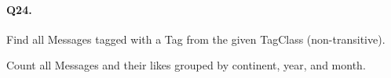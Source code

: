 \paragraph{Q24.}

Find all Messages tagged with a Tag from the given TagClass
(non-transitive).

Count all Messages and their likes grouped by continent, year, and
month.
